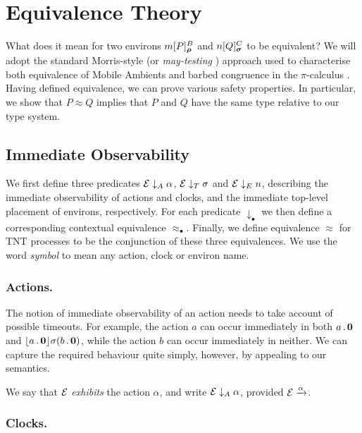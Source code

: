 \documentclass[orivec,envcountsame]{llncs}
\newcommand{\Exhibits}[1]{\mathrel{\downarrow_{#1}}}
\newcommand{\ExhibitsA}{\Exhibits{A}}
\newcommand{\ExhibitsT}{\Exhibits{T}}
\newcommand{\ExhibitsE}{\Exhibits{E}}
\newcommand{\Eq}{\approx}
\newcommand{\Does}[1]{\xderives{#1}}
\begin{document}
\section{Equivalence Theory}
\label{sec:equivalence-theory}

What does it mean for two environs $\locv{m}{P}{B}{\vec\rho}$ and
$\locv{n}{Q}{C}{\vec\sigma}$ to be equivalent? We will adopt the standard Morris-style  \cite{Mor68} (or \emph{may-testing} \cite{DNH84}) approach used to characterise
both equivalence of Mobile Ambients \cite{GC99} and barbed congruence in the
$\pi$-calculus \cite{sangiorgi:book}. Having defined equivalence, we can prove various
safety properties. In particular, we show that $P \Eq Q$ implies that $P$ and
$Q$ have the same type relative to our type system.

\subsection{Immediate Observability}
\label{sec:immediate-observability}

We first define three predicates $\expr \ExhibitsA \alpha$, $\expr \ExhibitsT
\sigma$ and $\expr \ExhibitsE n$, describing the immediate observability of
actions and clocks, and the immediate top-level placement of environs,
respectively. For each predicate $\Exhibits{\bullet}$ we then define a
corresponding contextual equivalence $\Eq_{\bullet}$. Finally, we define
equivalence $\Eq$ for TNT processes to be the conjunction of these three
equivalences. We use the word \emph{symbol} to mean any action, clock or environ
name.

\subsubsection{Actions.}
The notion of immediate observability of an action needs to take account
of possible timeouts. For example, the action $a$ can occur immediately
in both $a\,.\,\textbf{0}$ and $\lfloor{a\,.\,\textbf{0}}\rfloor {\sigma} ({b\,.\,\textbf{0}})$,
while the action $b$ can occur immediately in neither. We can capture
the required behaviour quite simply, however, by appealing to our
semantics.

\begin{definition}
We say that $\text{$\mathcal{E}$}$ \emph{exhibits} the action $\alpha$, and write
$\expr \ExhibitsA \alpha$, provided $\expr \Does{\alpha}$.
\end{definition}


\subsubsection{Clocks.} 
\end{document}
